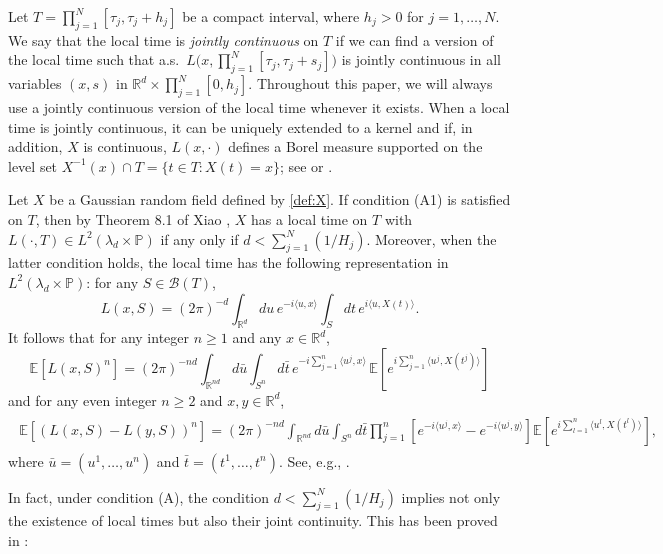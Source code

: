 \documentclass[11pt, reqno]{amsart}
\def\R{{\mathbb R}}
\def\E{{\mathbb E}}
\def\P{{\mathbb P}}
\numberwithin{equation}{section}
\begin{document}
Let $T = \prod_{j=1}^N[\tau_j, \tau_j+h_j]$ be a compact interval, where $h_j > 0$ for $j = 1, \dots, N$.
We say that the local time is \emph{jointly continuous} on $T$ if we can find a version of the local time such 
that a.s.~$L\big(x, \prod_{j=1}^N [\tau_j, \tau_j + s_j] \big)$ is jointly continuous in all variables $(x, s)$ in $\R^d 
\times \prod_{j=1}^N[0, h_j]$.
Throughout this paper, we will always use a jointly continuous version of the local time whenever it exists.
When a local time is jointly continuous, it can be uniquely extended to a kernel and if, in addition, $X$ is 
continuous, $L(x, \cdot)$ defines a Borel measure supported on the level set $X^{-1}(x) \cap T = \{t \in T : 
X(t) = x \}$; see \cite[p.12, Remark (c)]{GH80} or \cite[Theorem 8.6.1]{Adler}.

Let $X$ be a Gaussian random field defined by \eqref{def:X}.
If condition (A1) is satisfied on $T$, then by Theorem 8.1 of Xiao \cite{X09}, $X$ has a local time on $T$ with 
$L(\cdot, T) \in L^2(\lambda_d \times \P)$ if any only if $d < \sum_{j=1}^N (1/H_j)$. Moreover, when the 
latter condition holds, the local time has the following representation in $L^2(\lambda_d \times \P)$: for 
any $S \in \mathscr{B}(T)$,
\begin{equation}\label{Eq:local_time_rep}
L(x, S) = (2\pi)^{-d} \int_{\R^d} du\, e^{-i\langle u, x \rangle} \int_S dt\, e^{i\langle u, X(t) \rangle}.
\end{equation}
It follows that  for any integer $n \ge 1$ and any $x \in \R^d$,
\begin{equation}\label{Eq:local_time_mom}
\E[L(x, S)^n] = (2\pi)^{-nd} \int_{\R^{nd}} d\bar{u} \int_{S^n} d\bar{t} \, e^{-i\sum_{j=1}^n \langle u^j, x\rangle}\, 
\E\left[e^{i\sum_{j=1}^n\langle u^j, X(t^j) \rangle}\right]
\end{equation}
and for any even integer $n \ge 2$ and $x, y \in \R^d$,
\begin{align}
\begin{aligned}\label{Eq:local_time_incre_mom}
\E[(L(x, S) - L(y, S))^n]
= (2\pi)^{-nd}  \int_{\R^{nd}} d\bar{u} \int_{S^n} d\bar{t}
\prod_{j=1}^n \left[e^{-i\langle u^j, x\rangle} - e^{-i\langle u^j, y\rangle}\right] \E\left[e^{i\sum_{l=1}^n\langle u^l, X(t^l)\rangle}\right],
\end{aligned}
\end{align}
where $\bar{u} = (u^1, \dots, u^n)$ and $\bar{t} = (t^1, \dots, t^n)$. See, e.g., \cite[\S 25]{GH80}.

In fact, under condition (A), the condition $d < \sum_{j=1}^N (1/H_j)$  implies not only the existence of local times but also  
their joint continuity. This has been proved in \cite[Theorem 8.2]{X09}:
\end{document}
